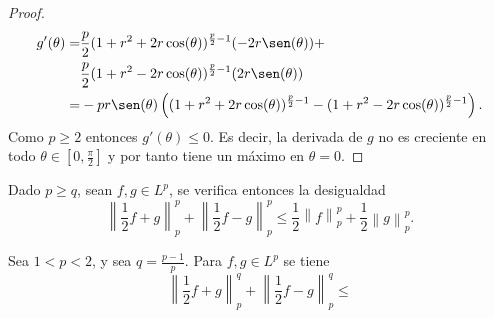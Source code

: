 \begin{proof}
    \begin{align}
        g'(\theta) = &\frac{p}{2}(1 + r^2 + 2r \cos(\theta))^{\frac{p}{2}-1} (-2r \sen(\theta)) + \\
        &\frac{p}{2}(1 + r^2 - 2r \cos(\theta))^{\frac{p}{2}-1} (2r \sen(\theta)) \\
        = &-pr \sen(\theta) \left((1+r^2 + 2r\cos(\theta))^{\frac{p}{2}-1} - (1+r^2 - 2r\cos(\theta))^{\frac{p}{2}-1}\right).
    \end{align}
    Como $ p \geq 2 $ entonces $g'(\theta) \leq 0 $. Es decir, la derivada de $ g $ no es creciente en todo $ \theta \in \left[0, \frac{\pi}{2}\right] $ y por tanto tiene un máximo en $ \theta = 0 $.
\end{proof}

\begin{theorem}
    Dado $ p \geq q $, sean $ f, g \in L^p $, se verifica entonces la desigualdad
    $$
        \left\| \frac{1}{2} f+g \right\|_p^p + \left\| \frac{1}{2} f-g \right\|_p^p \leq \frac{1}{2} \left\|f\right\|_p^p + \frac{1}{2}\left\|g\right\|_p^p.
    $$
\end{theorem}

\begin{theorem}
    Sea $ 1 < p < 2 $, y sea $ q = \frac{p-1}{p}$. Para $ f, g \in L^p $ se tiene
    $$
        \left\| \frac{1}{2}f + g\right\|_p^q + \left\| \frac{1}{2}f - g\right\|_p^q \leq
    $$
\end{theorem}